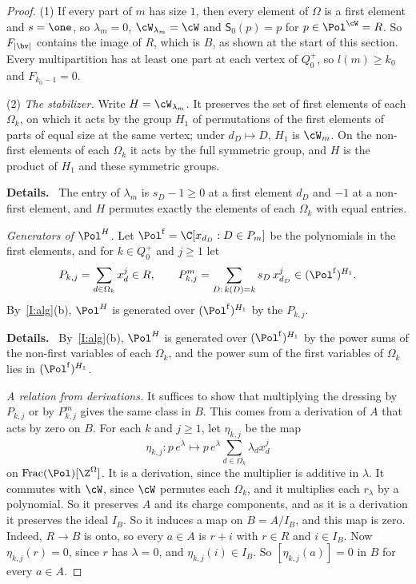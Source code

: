 \documentclass[11pt]{amsart}
\newenvironment{details}{\par\color{black!60!green}\noindent\textbf{Details.}\ }{\par}
\begin{document}
\begin{proof}
(1) If every part of $m$ has size $1$, then every element of $\Omega$ is a
first element and $s=\one$, so $\lambda_m=0$, $\cW_{\lambda_m}=\cW$ and
$\mathsf S_0(p)=p$ for $p\in \Pol^\cW=R$.  So $F_{|\bv|}$ contains the image
of $R$, which is $B$, as shown at the start of this section.  Every
multipartition has at least one part at each vertex of $Q_0^+$, so
$l(m)\ge k_0$ and $F_{k_0-1}=0$.

(2) \emph{The stabilizer.}  Write $H=\cW_{\lambda_m}$.  It preserves the set
of first elements of each $\Omega_k$, on which it acts by the group $H_1$ of
permutations of the first elements of parts of equal size at the same vertex;
under $d_D\mapsto D$, $H_1$ is $\cW_m$.  On the non-first elements of each
$\Omega_k$ it acts by the full symmetric group, and $H$ is the product of $H_1$
and these symmetric groups.
\begin{details}
The entry of
$\lambda_m$ is $s_D-1\ge0$ at a first element $d_D$ and $-1$ at a non-first
element, and $H$ permutes exactly the elements of each $\Omega_k$ with equal
entries.
\end{details}

\emph{Generators of $\Pol^H$.}  Let $\Pol^{\rm f}=\C[x_{d_D}:D\in P_m]$ be the
polynomials in the first elements, and for $k\in Q_0^+$ and $j\ge1$ let
\[
 P_{k,j}=\sum_{d\in\Omega_k}x_d^j\in R,\qquad
 P^m_{k,j}=\sum_{D:\,k(D)=k}s_D\,x_{d_D}^j\in(\Pol^{\rm f})^{H_1}.
\]
By~\ref{I:alg}(b), $\Pol^H$ is generated over $(\Pol^{\rm f})^{H_1}$ by the
$P_{k,j}$.
\begin{details}
By~\ref{I:alg}(b), $\Pol^H$ is generated over $(\Pol^{\rm f})^{H_1}$ by the
power sums of the non-first variables of each $\Omega_k$, and the power sum of
the first variables of $\Omega_k$ lies in $(\Pol^{\rm f})^{H_1}$.
\end{details}

\emph{A relation from derivations.}  It suffices to show that multiplying
the dressing by $P_{k,j}$ or by $P^m_{k,j}$ gives the same class in $B$.  This
comes from a derivation of $A$ that acts by zero on $B$.  For each $k$ and
$j\ge1$, let
$\eta_{k,j}$ be the map
\[
 \eta_{k,j}\colon p\,e^\lambda\mapsto p\,e^\lambda\sum_{d\in\Omega_k}\lambda_dx_d^j
\]
on $\mathrm{Frac}(\Pol)[\Z^\Omega]$.  It is a derivation, since the multiplier
is additive in $\lambda$.  It commutes with $\cW$, since $\cW$ permutes each
$\Omega_k$, and it multiplies each $r_\lambda$ by a polynomial.  So it
preserves $A$ and its charge components, and as it is a derivation it
preserves the ideal $I_B$.  So it induces a map on $B=A/I_B$, and this map is
zero.  Indeed, $R\to B$ is onto, so every $a\in A$ is $r+i$ with $r\in R$ and
$i\in I_B$.  Now $\eta_{k,j}(r)=0$, since $r$ has $\lambda=0$, and
$\eta_{k,j}(i)\in I_B$.  So $[\eta_{k,j}(a)]=0$ in $B$ for every $a\in A$.


\end{proof}
\end{document}
